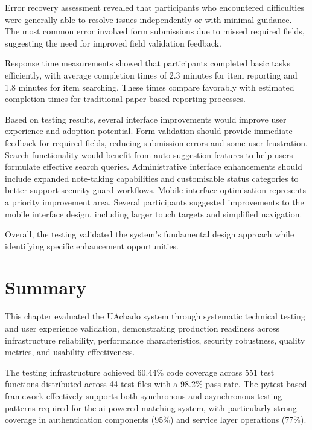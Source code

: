 Error recovery assessment revealed that participants who encountered difficulties were generally able to resolve issues independently or with minimal guidance. The most common error involved form submissions due to missed required fields, suggesting the need for improved field validation feedback.

Response time measurements showed that participants completed basic tasks efficiently, with average completion times of 2.3 minutes for item reporting and 1.8 minutes for item searching. These times compare favorably with estimated completion times for traditional paper-based reporting processes.

Based on testing results, several interface improvements would improve user experience and adoption potential. Form validation should provide immediate feedback for required fields, reducing submission errors and some user frustration. Search functionality would benefit from auto-suggestion features to help users formulate effective search queries. Administrative interface enhancements should include expanded note-taking capabilities and customisable status categories to better support security guard workflows. Mobile interface optimisation represents a priority improvement area. Several participants suggested improvements to the mobile interface design, including larger touch targets and simplified navigation.

Overall, the testing validated the system's fundamental design approach while identifying specific enhancement opportunities.

\section{Summary} \label{section:testing_summary}

This chapter evaluated the UAchado system through systematic technical testing and user experience validation, demonstrating production readiness across infrastructure reliability, performance characteristics, security robustness, quality metrics, and usability effectiveness.

The testing infrastructure achieved 60.44\% code coverage across 551 test functions distributed across 44 test files with a 98.2\% pass rate. The pytest-based framework effectively supports both synchronous and asynchronous testing patterns required for the \ac{ai}-powered matching system, with particularly strong coverage in authentication components (95\%) and service layer operations (77\%).

